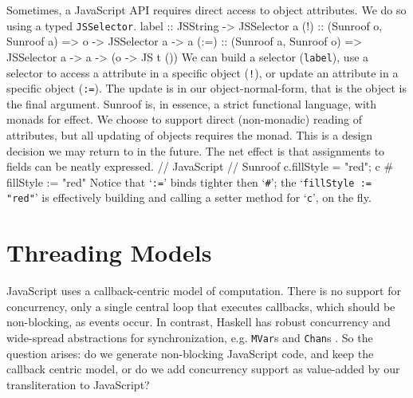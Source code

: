 \documentclass{llncs}
\newcommand{\Src}[1]{{\tt{#1}}}
\newenvironment{Code}{\verbatim}{\endverbatim}
\begin{document}
Sometimes, a JavaScript API requires direct access to object attributes.
We do so using a typed \Src{JSSelector}.
\begin{Code}
label :: JSString -> JSSelector a
(!)   :: (Sunroof o, Sunroof a) => o -> JSSelector a -> a
(:=)  :: (Sunroof a, Sunroof o) => JSSelector a -> a -> (o -> JS t ())
\end{Code}
We can build a selector (\Src{label}), use a selector to access a attribute in a specific
object (\Src{!}), or update an attribute in a specific object (\Src{:=}).
The update is in our object-normal-form, that is the object is the final argument.
Sunroof is, in essence, a strict functional language, with monads for effect.
We choose to support direct (non-monadic) reading of attributes, but
all updating of objects requires the monad.
This is a design decision we may return to in the future.
The net effect is that assignments to fields can be neatly expressed.
\begin{Code}
  // JavaScript                         // Sunroof
  c.fillStyle = "red";                  c # fillStyle := "red"
\end{Code}
Notice that `\Src{:=}' binds tighter then `\Src{\#}'; the `\Src{fillStyle := "red"}' is
effectively building and calling a setter method for `\Src{c}', on the fly.



\section{Threading Models}
\label{sec:threading-models}

JavaScript uses a callback-centric model of computation. There
is no support for concurrency, only a single central loop that executes
callbacks, which should be non-blocking, as events occur.
In contrast, Haskell has robust concurrency and wide-spread 
abstractions for synchronization, e.g. \Src{MVar}s and \Src{Chan}s
\cite{Jones:96:ConcurrentHaskell}.
So the question arises: do we generate non-blocking JavaScript code, 
and keep the callback centric model, or do we add concurrency
support as value-added by our transliteration to JavaScript?
\end{document}
